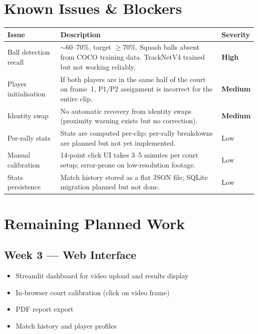 \documentclass[12pt,a4paper]{article}
\newcommand{\inprogress}[1]{\textcolor{partial}{\textbf{#1}}}
\newcommand{\blocked}[1]{\textcolor{blocked}{\textbf{#1}}}
\begin{document}
\section{Known Issues \& Blockers}

\begin{center}
\begin{tabular}{p{4cm}p{7cm}l}
\toprule
\textbf{Issue} & \textbf{Description} & \textbf{Severity} \\
\midrule
Ball detection recall & $\sim$60--70\%, target $\geq$70\%. Squash balls absent from COCO training data. TrackNetV4 trained but not working reliably. & \blocked{High} \\[6pt]
Player initialisation & If both players are in the same half of the court on frame~1, P1/P2 assignment is incorrect for the entire clip. & \inprogress{Medium} \\[6pt]
Identity swap & No automatic recovery from identity swaps (proximity warning exists but no correction). & \inprogress{Medium} \\[6pt]
Per-rally stats & Stats are computed per-clip; per-rally breakdowns are planned but not yet implemented. & Low \\[6pt]
Manual calibration & 14-point click UI takes 3--5 minutes per court setup; error-prone on low-resolution footage. & Low \\[6pt]
Stats persistence & Match history stored as a flat JSON file; SQLite migration planned but not done. & Low \\
\bottomrule
\end{tabular}
\end{center}

\section{Remaining Planned Work}

\subsection*{Week 3 — Web Interface}
\begin{itemize}[noitemsep]
    \item Streamlit dashboard for video upload and results display
    \item In-browser court calibration (click on video frame)
    \item PDF report export
    \item Match history and player profiles
\end{itemize}
\end{document}
